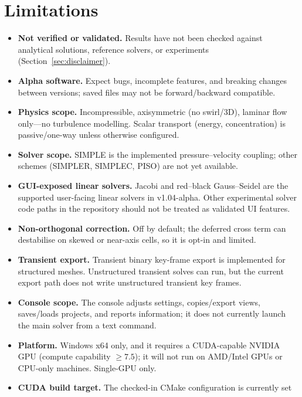 \documentclass[11pt]{article}
\begin{document}
\section{Limitations}\label{sec:limitations}
\begin{itemize}[nosep]
  \item \textbf{Not verified or validated.} Results have not been checked against
        analytical solutions, reference solvers, or experiments (Section~\ref{sec:disclaimer}).
  \item \textbf{Alpha software.} Expect bugs, incomplete features, and breaking changes
        between versions; saved files may not be forward/backward compatible.
  \item \textbf{Physics scope.} Incompressible, axisymmetric (no swirl/3D), laminar
        flow only---no turbulence modelling. Scalar transport (energy, concentration)
        is passive/one-way unless otherwise configured.
  \item \textbf{Solver scope.} SIMPLE is the implemented pressure--velocity coupling;
        other schemes (SIMPLER, SIMPLEC, PISO) are not yet available.
  \item \textbf{GUI-exposed linear solvers.} Jacobi and red--black Gauss--Seidel are
        the supported user-facing linear solvers in v1.04-alpha. Other experimental
        solver code paths in the repository should not be treated as validated UI
        features.
  \item \textbf{Non-orthogonal correction.} Off by default; the deferred cross term can
        destabilise on skewed or near-axis cells, so it is opt-in and limited.
  \item \textbf{Transient export.} Transient binary key-frame export is implemented
        for structured meshes. Unstructured transient solves can run, but the current
        export path does not write unstructured transient key frames.
  \item \textbf{Console scope.} The console adjusts settings, copies/export views,
        saves/loads projects, and reports information; it does not currently launch the
        main solver from a text command.
  \item \textbf{Platform.} Windows x64 only, and it requires a CUDA-capable NVIDIA GPU
        (compute capability $\geq 7.5$); it will not run on AMD/Intel GPUs or CPU-only
        machines. Single-GPU only.
  \item \textbf{CUDA build target.} The checked-in CMake configuration is currently set

\end{itemize}
\end{document}
